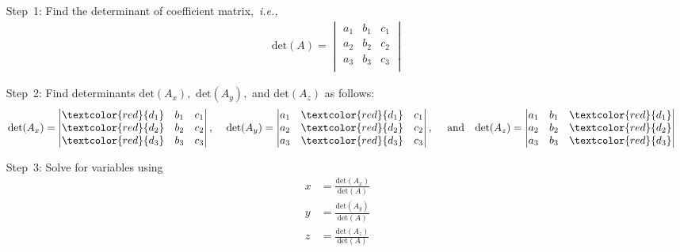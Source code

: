 \begin{enumerate}
\item[Step~1:] Find the determinant of coefficient matrix,~\textit{i.e.,} 
\begin{align*}
\mathrm{det}(A) = 
\begin{vmatrix}
a_1 & b_1 & c_1\\
a_2 & b_2 & c_2\\
a_3 & b_3 & c_3\\
\end{vmatrix}
\end{align*}

\item[Step~2:] Find determinants $\mathrm{det}(A_x),$ $\mathrm{det}(A_y),$ and $\mathrm{det}(A_z)$ as follows:
\begin{align*}
\mathrm{det}(A_x) = 
\begin{vmatrix}
\textcolor{red}{d_1} & b_1 & c_1\\
\textcolor{red}{d_2} & b_2 & c_2\\
\textcolor{red}{d_3} & b_3 & c_3\\
\end{vmatrix}, ~~~~&
\mathrm{det}(A_y) = 
\begin{vmatrix}
a_1 & \textcolor{red}{d_1} & c_1\\
a_2 & \textcolor{red}{d_2} & c_2\\
a_3 & \textcolor{red}{d_3} & c_3\\
\end{vmatrix}, ~~~~\mathrm{and}~~~
\mathrm{det}(A_z) = 
\begin{vmatrix}
a_1 & b_1 & \textcolor{red}{d_1}\\
a_2 & b_2 & \textcolor{red}{d_2}\\
a_3 & b_3 & \textcolor{red}{d_3}\\
\end{vmatrix}
\end{align*}

\item[Step~3:] Solve for variables using
\begin{align*}
x &= \frac{\mathrm{det}(A_x)}{\mathrm{det}(A)}\\
y &= \frac{\mathrm{det}(A_y)}{\mathrm{det}(A)}\\
z &= \frac{\mathrm{det}(A_z)}{\mathrm{det}(A)}
\end{align*}

\end{enumerate} 



